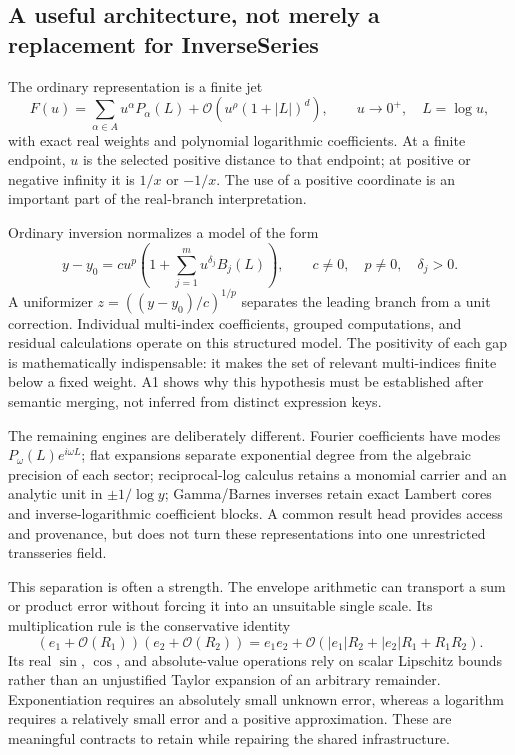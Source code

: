 \documentclass[11pt,letterpaper]{article}
\newcommand{\OO}{\mathcal O}
\begin{document}
\subsection{A useful architecture, not merely a replacement for InverseSeries}
The ordinary representation is a finite jet
\begin{equation}
 F(u)=\sum_{\alpha\in A}u^\alpha P_\alpha(L)
       +\OO\!\left(u^\rho(1+|L|)^d\right),
 \qquad u\to0^+,\quad L=\log u,
 \label{eq:jet}
\end{equation}
with exact real weights and polynomial logarithmic coefficients. At a finite endpoint, $u$ is the selected positive distance to that endpoint; at positive or negative infinity it is $1/x$ or $-1/x$. The use of a positive coordinate is an important part of the real-branch interpretation.\cite{core}

Ordinary inversion normalizes a model of the form
\begin{equation}
 y-y_0=c u^p\left(1+\sum_{j=1}^{m}u^{\delta_j}B_j(L)\right),
 \qquad c\ne0,\quad p\ne0,\quad\delta_j>0.
 \label{eq:inversemodel}
\end{equation}
A uniformizer $z=((y-y_0)/c)^{1/p}$ separates the leading branch from a unit correction. Individual multi-index coefficients, grouped computations, and residual calculations operate on this structured model. The positivity of each gap is mathematically indispensable: it makes the set of relevant multi-indices finite below a fixed weight. A1 shows why this hypothesis must be established after semantic merging, not inferred from distinct expression keys.\cite{core}

The remaining engines are deliberately different. Fourier coefficients have modes $P_\omega(L)e^{i\omega L}$; flat expansions separate exponential degree from the algebraic precision of each sector; reciprocal-log calculus retains a monomial carrier and an analytic unit in $\pm1/\log y$; Gamma/Barnes inverses retain exact Lambert cores and inverse-logarithmic coefficient blocks. A common result head provides access and provenance, but does not turn these representations into one unrestricted transseries field.\cite{readme,fourier,flat-ops,reciprocal,gamma-ops}

This separation is often a strength. The envelope arithmetic can transport a sum or product error without forcing it into an unsuitable single scale. Its multiplication rule is the conservative identity
\[
 (e_1+\OO(R_1))(e_2+\OO(R_2))
 =e_1e_2+\OO\!\left(|e_1|R_2+|e_2|R_1+R_1R_2\right).
\]
Its real $\sin$, $\cos$, and absolute-value operations rely on scalar Lipschitz bounds rather than an unjustified Taylor expansion of an arbitrary remainder. Exponentiation requires an absolutely small unknown error, whereas a logarithm requires a relatively small error and a positive approximation. These are meaningful contracts to retain while repairing the shared infrastructure.\cite{envelopes}
\end{document}
